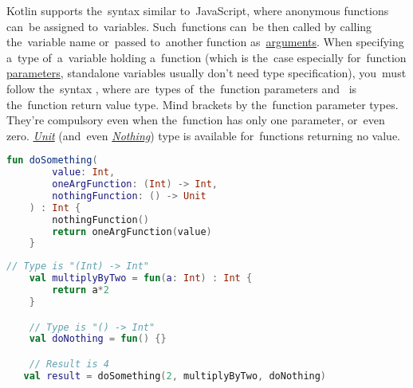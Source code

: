 \label{kotlinanonymousfunction}
Kotlin supports the~syntax similar to~JavaScript, where anonymous functions can~be assigned to~variables.
Such~functions can~be then called by calling the~variable name or~passed to~another function as~\hyperref[parameterargument]{arguments}.
When specifying a~type of~a~variable holding a~function (which is the~case especially for~function \hyperref[parameterargument]{parameters}, standalone variables usually don't need type specification), you~must follow the~syntax , where  are~types of~the~function parameters \mbox{and } is the~function return value type.
Mind brackets by the~function parameter types.
They're compulsory even when the~function has only one parameter, or~even zero.
\hyperref[kotlinunit]{\textit{Unit}} (and~even \hyperref[kotlinnothing]{\textit{Nothing}}) type is available for~functions returning no value.

\example
\begin{lstlisting}[language=Kotlin, title={Function taking other functions as parameters}]
    fun doSomething(
        value: Int,
        oneArgFunction: (Int) -> Int,
        nothingFunction: () -> Unit
    ) : Int {
        nothingFunction()
        return oneArgFunction(value)
    }
\end{lstlisting}
\begin{lstlisting}[language=Kotlin, title={Usage}]
    // Type is "(Int) -> Int"
    val multiplyByTwo = fun(a: Int) : Int {
        return a*2
    }

    // Type is "() -> Int"
    val doNothing = fun() {}

    // Result is 4
   val result = doSomething(2, multiplyByTwo, doNothing)
\end{lstlisting}
